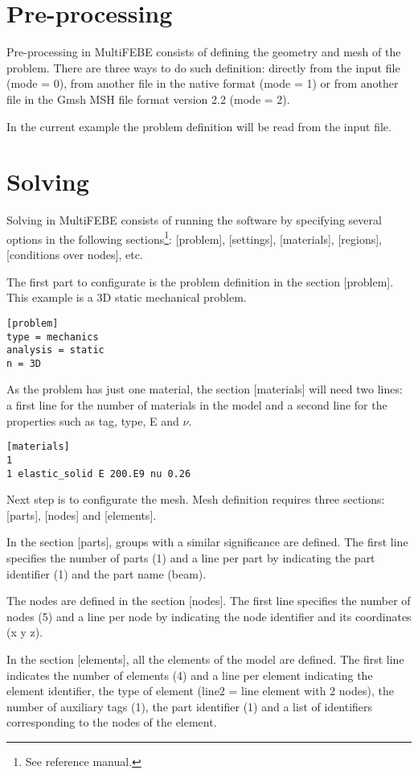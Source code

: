 \documentclass[a4]{article}
\begin{document}
\section{Pre-processing} 
Pre-processing in MultiFEBE consists of defining the geometry and mesh of the problem. There are three ways to do such definition: directly from the input file (mode = 0), from another file in the native format (mode = 1) or from another file in the Gmsh MSH file format version 2.2 (mode = 2). 

In the current example the problem definition will be read from the input file. 

\section{Solving}
Solving in MultiFEBE consists of running the software by specifying several options in the following sections\footnote{See reference manual.}: [problem], [settings], [materials], [regions], [conditions over nodes], etc.

The first part to configurate is the problem definition in the section [problem]. This example is a 3D static mechanical problem.

\begin{Verbatim}	
[problem]
type = mechanics
analysis = static
n = 3D
\end{Verbatim}

As the problem has just one material, the section [materials] will need two lines: a first line for the number of materials in the model and a second line for the properties such as tag, type, E and $\nu$.

\begin{Verbatim}
[materials]
1
1 elastic_solid E 200.E9 nu 0.26
\end{Verbatim}

Next step is to configurate the mesh. Mesh definition requires three sections: [parts], [nodes] and [elements]. 

In the section [parts], groups with a similar significance are defined. The first line specifies the number of parts (1) and a line per part by indicating the part identifier (1) and the part name (beam).    

The nodes are defined in the section [nodes]. The first line specifies the number of nodes (5) and a line per node by indicating the node identifier and its coordinates (x y z).    

In the section [elements], all the elements of the model are defined. The first line indicates the number of elements (4) and a line per element indicating the element identifier, the type of element (line2 = line element with 2 nodes), the number of auxiliary tags (1), the part identifier (1) and a list of identifiers corresponding to the nodes of the element.
\end{document}

